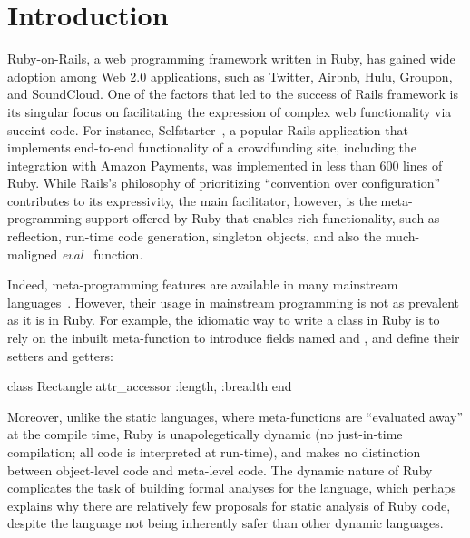 \section{Introduction}

Ruby-on-Rails, a web programming framework written in Ruby, has gained
wide adoption among Web 2.0 applications, such as Twitter, Airbnb,
Hulu, Groupon, and SoundCloud.  One of the factors that led to the
success of Rails framework is its singular focus on facilitating the
expression of complex web functionality via succint code. For
instance, Selfstarter~\cite{selfstarter}, a popular Rails application
that implements end-to-end functionality of a crowdfunding site,
including the integration with Amazon Payments, was implemented in
less than 600 lines of Ruby. While Rails's philosophy of prioritizing
``convention over configuration''~\cite{railsphilosophy} contributes
to its expressivity, the main facilitator, however, is the
meta-programming support offered by Ruby that enables rich
functionality, such as reflection, run-time code generation, singleton
objects, and also the much-maligned \emph{eval}~\cite{eval} function.  

Indeed, meta-programming features are available in many mainstream
languages~\cite{MetaOCaml, LMS}. However, their usage in mainstream
programming is not as prevalent as it is in Ruby. For example, the
idiomatic way to write a  class in Ruby is to rely on the
inbuilt  meta-function to introduce fields named
 and , and define their setters and getters:
\begin{coderuby}
class Rectangle
  attr_accessor :length, :breadth
end
\end{coderuby}
Moreover, unlike the static languages, where meta-functions are
``evaluated away'' at the compile time, Ruby is unapolegetically
dynamic (no just-in-time compilation; all code is interpreted at
run-time), and makes no distinction between object-level code and
meta-level code. The dynamic nature of Ruby complicates the task of
building formal analyses for the language, which perhaps explains why
there are relatively few proposals for static analysis of Ruby code,
despite the language not being inherently safer than other dynamic
languages.

